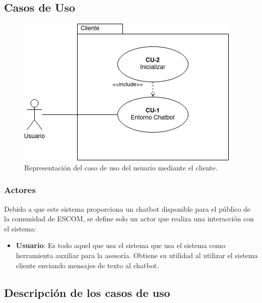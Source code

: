 \subsection{Casos de Uso}

\begin{figure}[ht]
    \centering
    \includegraphics[scale=0.61]{images/5/casos-de-uso}
    \caption{Representación del caso de uso del usuario mediante el cliente.}
    \label{fig:diagrama-casos-de-uso} 
\end{figure}

\subsubsection{Actores}

Debido a que este sistema proporciona un chatbot disponible para el público de la comunidad de ESCOM, se define solo un actor que realiza una interacción con el sistema:

\begin{itemize}
    \item \textbf{Usuario}: Es todo aquel que usa el sistema que usa el sistema como herramienta auxiliar para la asesoría. Obtiene su utilidad al utilizar el sistema cliente enviando mensajes de texto al chatbot.
\end{itemize}

\subsection{Descripción de los casos de uso}
\label{sec:casos-de-uso}

